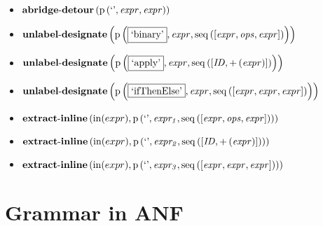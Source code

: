 {\begin{itemize}
\item $\mathbf{abridge\text{-}detour}\\\left(\mathrm{p}\left(\text{`'},\mathit{expr},\mathit{expr}\right)\right)$
\item $\mathbf{unlabel\text{-}designate}\\\left(\mathrm{p}\left(\fbox{\text{`binary'}},\mathit{expr},\mathrm{seq}\left(\left[\mathit{expr}, \mathit{ops}, \mathit{expr}\right]\right)\right)\right)$
\item $\mathbf{unlabel\text{-}designate}\\\left(\mathrm{p}\left(\fbox{\text{`apply'}},\mathit{expr},\mathrm{seq}\left(\left[\mathit{ID}, {+}\left(\mathit{expr}\right)\right]\right)\right)\right)$
\item $\mathbf{unlabel\text{-}designate}\\\left(\mathrm{p}\left(\fbox{\text{`ifThenElse'}},\mathit{expr},\mathrm{seq}\left(\left[\mathit{expr}, \mathit{expr}, \mathit{expr}\right]\right)\right)\right)$
\item $\mathbf{extract\text{-}inline}\left(\mathrm{in}(expr),\\\mathrm{p}\left(\text{`'},\mathit{expr_1},\mathrm{seq}\left(\left[\mathit{expr}, \mathit{ops}, \mathit{expr}\right]\right)\right)\right)$
\item $\mathbf{extract\text{-}inline}\left(\mathrm{in}(expr),\\\mathrm{p}\left(\text{`'},\mathit{expr_2},\mathrm{seq}\left(\left[\mathit{ID}, {+}\left(\mathit{expr}\right)\right]\right)\right)\right)$
\item $\mathbf{extract\text{-}inline}\left(\mathrm{in}(expr),\\\mathrm{p}\left(\text{`'},\mathit{expr_3},\mathrm{seq}\left(\left[\mathit{expr}, \mathit{expr}, \mathit{expr}\right]\right)\right)\right)$
\end{itemize}}

\section{Grammar in ANF}

